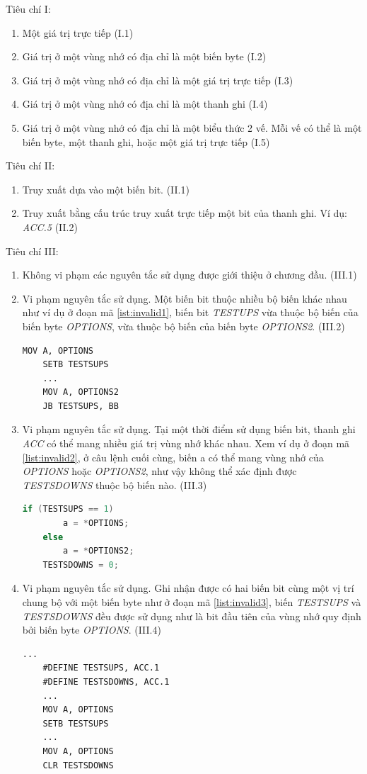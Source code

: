 Tiêu chí I:
\begin{enumerate}
	\item Một giá trị trực tiếp (I.1)
	\item Giá trị ở một vùng nhớ có địa chỉ là một biến byte (I.2)
	\item Giá trị ở một vùng nhớ có địa chỉ là một giá trị trực tiếp (I.3)
	\item Giá trị ở một vùng nhớ có địa chỉ là một thanh ghi (I.4)
	\item Giá trị ở một vùng nhớ có địa chỉ là một biểu thức 2 vế. Mỗi vế có thể là một biến byte, một thanh ghi, hoặc một giá trị trực tiếp (I.5)
\end{enumerate}

Tiêu chí II:
\begin{enumerate}
	\item Truy xuất dựa vào một biến bit. (II.1)
	\item Truy xuất bằng cấu trúc truy xuất trực tiếp một bit của thanh ghi. Ví dụ: \textit{ACC.5} (II.2)
\end{enumerate}

Tiêu chí III:
\begin{enumerate}
	\item Không vi phạm các nguyên tắc sử dụng được giới thiệu ở chương đầu. (III.1)
	\item Vi phạm nguyên tắc sử dụng. Một biến bit thuộc nhiều bộ biến khác nhau như ví dụ ở đoạn mã \ref{ist:invalid1}, biến bit \textit{TESTUPS} vừa thuộc bộ biến của biến byte \textit{OPTIONS}, vừa thuộc bộ biến của biến byte \textit{OPTIONS2}. (III.2)
	\begin{lstlisting}[caption={Đoạn mã có một biến bit thuộc nhiều bộ biến khác nhau},label={list:invalid1}]
	MOV A, OPTIONS
	SETB TESTSUPS
	...
	MOV A, OPTIONS2
	JB TESTSUPS, BB
	\end{lstlisting}
	\item Vi phạm nguyên tắc sử dụng. Tại một thời điểm sử dụng biến bit, thanh ghi \textit{ACC} có thể mang nhiều giá trị vùng nhớ khác nhau. Xem ví dụ ở đoạn mã \ref{list:invalid2}, ở câu lệnh cuối cùng, biến a có thể mang vùng nhớ của \textit{OPTIONS} hoặc \textit{OPTIONS2}, như vậy không thể xác định được \textit{TESTSDOWNS} thuộc bộ biến nào. (III.3)
	\begin{lstlisting}[caption={Đoạn mã ACC có thể mang nhiều giá trị vùng nhớ khác nhau},label={list:invalid2}, language=c++]
	if (TESTSUPS == 1)
		a = *OPTIONS;
	else
		a = *OPTIONS2;
	TESTSDOWNS = 0;
	\end{lstlisting}
	\item Vi phạm nguyên tắc sử dụng. Ghi nhận được có hai biến bit cùng một vị trí chung bộ với một biến byte như ở đoạn mã \ref{list:invalid3}, biến \textit{TESTSUPS} và \textit{TESTSDOWNS} đều được sử dụng như là bit đầu tiên của vùng nhớ quy định bởi biến byte \textit{OPTIONS}. (III.4)
	\begin{lstlisting}[caption={Đoạn mã có 2 biến bit cùng một vị trí và đều được ghi nhận cùng bộ với một biến byte},label={list:invalid3}]
	...
	#DEFINE TESTSUPS, ACC.1
	#DEFINE TESTSDOWNS, ACC.1
	...
	MOV A, OPTIONS
	SETB TESTSUPS
	...
	MOV A, OPTIONS
	CLR TESTSDOWNS
	\end{lstlisting}
\end{enumerate}

